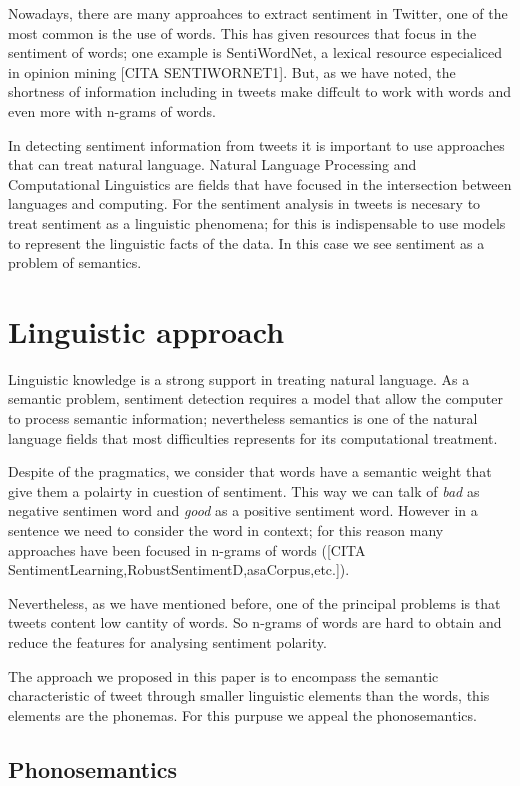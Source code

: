 \documentclass[12pt,journal,compsoc]{IEEEtran}
\begin{document}
Nowadays, there are many approahces to extract sentiment in Twitter, one of the most common is the use of words.  This has given resources that focus in the sentiment of words; one example is SentiWordNet, a lexical resource especialiced in opinion mining [CITA SENTIWORNET1]. But, as we have noted, the shortness of information including in tweets make diffcult to work with words and even more with n-grams of words.

In detecting sentiment information from tweets it is important to use approaches that can treat natural language. Natural Language Processing and Computational Linguistics are fields that have focused in the intersection between languages and computing. For the sentiment analysis in tweets is necesary to treat sentiment as a linguistic phenomena; for this is indispensable to use models to represent the linguistic facts of the data. In this case we see sentiment as a problem of semantics. 


\section{Linguistic approach}

Linguistic knowledge is a strong support in treating natural language. As a semantic problem, sentiment detection requires a model that allow the computer to process semantic information; nevertheless semantics is one of the natural language fields that most difficulties represents for its computational treatment. 

Despite of the pragmatics, we consider that words have a semantic weight that give them a polairty in cuestion of sentiment. This way we can talk of 
\emph{bad} as negative sentimen word and \emph{good} as a positive sentiment word. However in a sentence we need to consider the word in context; for this reason many approaches have been focused in n-grams of words ([CITA SentimentLearning,RobustSentimentD,asaCorpus,etc.]). 

Nevertheless, as we have mentioned before, one of the principal problems is that tweets content low cantity of words. So n-grams of words are hard to obtain and reduce the features for analysing sentiment polarity.

The approach we proposed in this paper is to encompass the semantic characteristic of tweet through smaller linguistic elements than the words, this elements are the phonemas. For this purpuse we appeal the phonosemantics.

\subsection{Phonosemantics}
\end{document}
